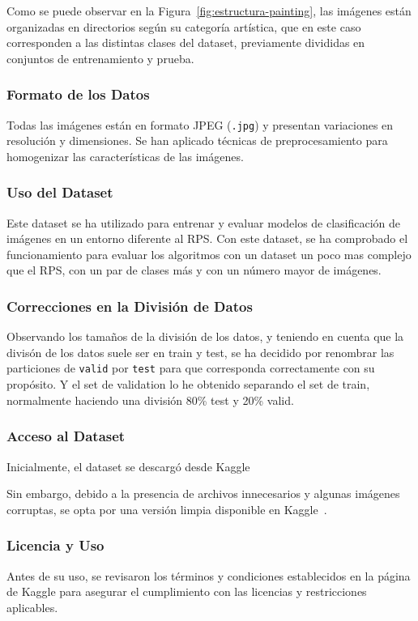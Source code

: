 Como se puede observar en la Figura~\ref{fig:estructura-painting}, las imágenes están organizadas en directorios según su categoría artística,
que en este caso corresponden a las distintas clases del dataset, previamente divididas en conjuntos de entrenamiento y prueba.

\subsubsection{Formato de los Datos}
Todas las imágenes están en formato JPEG (\texttt{.jpg}) y presentan variaciones en resolución y dimensiones.
Se han aplicado técnicas de preprocesamiento para homogenizar las características de las imágenes.

\subsubsection{Uso del Dataset}
Este dataset se ha utilizado para entrenar y evaluar modelos de clasificación de imágenes en un entorno diferente al
RPS\@.
Con este dataset, se ha comprobado el funcionamiento para evaluar los algoritmos con un dataset un poco mas complejo
que el RPS, con un par de clases más y con un número mayor de imágenes.

\subsubsection{Correcciones en la División de Datos}
Observando los tamaños de la división de los datos, y teniendo en cuenta que la divisón de los datos suele ser en train
y test, se ha decidido por renombrar las particiones de \texttt{valid} por \texttt{test} para que corresponda
correctamente con su propósito.
Y el set de validation lo he obtenido separando el set de train, normalmente haciendo una división 80\% test y 20\%
valid.

\subsubsection{Acceso al Dataset}
Inicialmente, el dataset se descargó desde Kaggle~\cite{OriginalArtImages}

Sin embargo, debido a la presencia de archivos innecesarios y algunas imágenes corruptas, se opta por una versión
limpia disponible en Kaggle~\cite{CleanedArtImages}.

\subsubsection{Licencia y Uso}
Antes de su uso, se revisaron los términos y condiciones establecidos en la página de Kaggle para asegurar el
cumplimiento con las licencias y restricciones aplicables.

